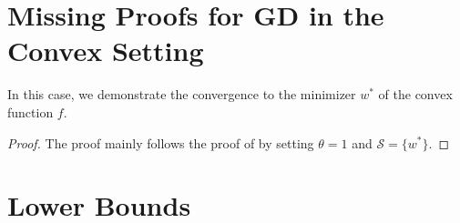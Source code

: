 \documentclass[a4paper,11pt]{article}
\newcommand{\cS}{\mathcal{S}}
\newcommand{\1}{\mathbbm{1}}
\theoremstyle{plain}
\begin{document}
\section{Missing Proofs for GD in the Convex Setting}

In this case, we demonstrate the convergence to the minimizer $w^*$ of the convex function $f.$

\begin{proof}
   The proof mainly follows the proof of  by setting $\theta=1$ and $\cS=\{w^*\}.$
\end{proof}


\section{Lower Bounds}

\label{sec:lower_bounds_proofs}

\lowerbounds*
\end{document}
